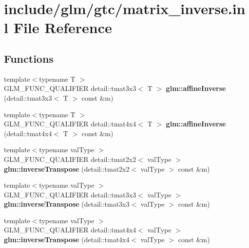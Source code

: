 \hypertarget{matrix__inverse_8inl}{\section{include/glm/gtc/matrix\-\_\-inverse.inl \-File \-Reference}
\label{matrix__inverse_8inl}
}
\subsection*{\-Functions}
\begin{DoxyCompactItemize}
\item 
\hypertarget{namespaceglm_a95a9a0c884de397420c2b48eed765f82}{{\footnotesize template$<$typename T $>$ }\\\-G\-L\-M\-\_\-\-F\-U\-N\-C\-\_\-\-Q\-U\-A\-L\-I\-F\-I\-E\-R \*
detail\-::tmat3x3$<$ \-T $>$ {\bfseries glm\-::affine\-Inverse} (detail\-::tmat3x3$<$ \-T $>$ const \&m)}\label{namespaceglm_a95a9a0c884de397420c2b48eed765f82}

\item 
\hypertarget{namespaceglm_a4d94de1f111e09fb413c79fcca8836ff}{{\footnotesize template$<$typename T $>$ }\\\-G\-L\-M\-\_\-\-F\-U\-N\-C\-\_\-\-Q\-U\-A\-L\-I\-F\-I\-E\-R \*
detail\-::tmat4x4$<$ \-T $>$ {\bfseries glm\-::affine\-Inverse} (detail\-::tmat4x4$<$ \-T $>$ const \&m)}\label{namespaceglm_a4d94de1f111e09fb413c79fcca8836ff}

\item 
\hypertarget{namespaceglm_aa6b8ec4bc1611b1d2784e81d27ff3f13}{{\footnotesize template$<$typename val\-Type $>$ }\\\-G\-L\-M\-\_\-\-F\-U\-N\-C\-\_\-\-Q\-U\-A\-L\-I\-F\-I\-E\-R \*
detail\-::tmat2x2$<$ val\-Type $>$ {\bfseries glm\-::inverse\-Transpose} (detail\-::tmat2x2$<$ val\-Type $>$ const \&m)}\label{namespaceglm_aa6b8ec4bc1611b1d2784e81d27ff3f13}

\item 
\hypertarget{namespaceglm_aa7d23629fec4e42bcb8e153948f62fc1}{{\footnotesize template$<$typename val\-Type $>$ }\\\-G\-L\-M\-\_\-\-F\-U\-N\-C\-\_\-\-Q\-U\-A\-L\-I\-F\-I\-E\-R \*
detail\-::tmat3x3$<$ val\-Type $>$ {\bfseries glm\-::inverse\-Transpose} (detail\-::tmat3x3$<$ val\-Type $>$ const \&m)}\label{namespaceglm_aa7d23629fec4e42bcb8e153948f62fc1}

\item 
\hypertarget{namespaceglm_af5ab380be693032a4f1b4fe58841c13e}{{\footnotesize template$<$typename val\-Type $>$ }\\\-G\-L\-M\-\_\-\-F\-U\-N\-C\-\_\-\-Q\-U\-A\-L\-I\-F\-I\-E\-R \*
detail\-::tmat4x4$<$ val\-Type $>$ {\bfseries glm\-::inverse\-Transpose} (detail\-::tmat4x4$<$ val\-Type $>$ const \&m)}\label{namespaceglm_af5ab380be693032a4f1b4fe58841c13e}

\end{DoxyCompactItemize}



